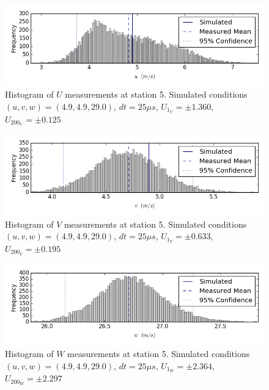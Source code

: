 \begin{figure}[H]
\centering
\includegraphics[width=6in]{figs/Ely_May28th05001/uncertainty_Ely_May28th05001_U}
\caption{Histogram of $U$ measurements at station 5. Simulated conditions $(u,v,w)=(4.9, 4.9, 29.0)$, $dt=25 \mu s$, $U_{1_{U}}=\pm 1.360$, $U_{200_{U}}=\pm 0.125$}
\label{fig:uncertainty_Ely_May28th05001_U}
\end{figure}


\begin{figure}[H]
\centering
\includegraphics[width=6in]{figs/Ely_May28th05001/uncertainty_Ely_May28th05001_V}
\caption{Histogram of $V$ measurements at station 5. Simulated conditions $(u,v,w)=(4.9, 4.9, 29.0)$, $dt=25 \mu s$, $U_{1_{V}}=\pm 0.633$, $U_{200_{V}}=\pm 0.195$}
\label{fig:uncertainty_Ely_May28th05001_V}
\end{figure}


\begin{figure}[H]
\centering
\includegraphics[width=6in]{figs/Ely_May28th05001/uncertainty_Ely_May28th05001_W}
\caption{Histogram of $W$ measurements at station 5. Simulated conditions $(u,v,w)=(4.9, 4.9, 29.0)$, $dt=25 \mu s$, $U_{1_{W}}=\pm 2.364$, $U_{200_{W}}=\pm 2.297$}
\label{fig:uncertainty_Ely_May28th05001_W}
\end{figure}


